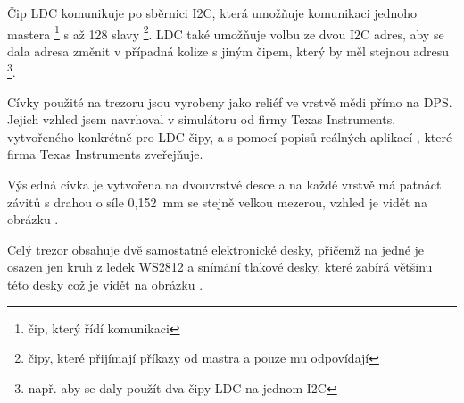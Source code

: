 Čip LDC komunikuje po sběrnici I2C, která umožňuje komunikaci jednoho mastera \footnote{čip, který řídí komunikaci} s až 128 slavy 
\footnote{čipy, které přijímají příkazy od mastra a pouze mu odpovídají}. LDC také umožňuje volbu ze dvou I2C adres, aby se dala adresa změnit v případná 
kolize s jiným čipem, který by měl stejnou adresu \footnote{např. aby se daly použít dva čipy LDC na jednom I2C}.

\newpage

Cívky použité na trezoru jsou vyrobeny jako reliéf ve vrstvě mědi přímo na DPS. Jejich vzhled jsem navrhoval v simulátoru od firmy Texas Instruments, 
vytvořeného konkrétně pro LDC čipy, a s pomocí popisů reálných aplikací \parencite{LDC-cd0} \parencite{LDC-cd1}, které firma Texas Instruments zveřejňuje.


Výsledná cívka je vytvořena na dvouvrstvé desce a na každé vrstvě má patnáct závitů s drahou o síle 0,152~mm se stejně velkou mezerou, 
vzhled je vidět na obrázku .

Celý trezor obsahuje dvě samostatné elektronické desky, přičemž na jedné je osazen jen kruh z ledek WS2812 a snímání tlakové desky, které zabírá 
většinu této desky což je vidět na obrázku .

\newpage